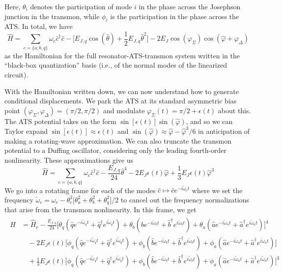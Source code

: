 Here, $\theta_i$ denotes the participation of mode $i$ in the phase across the Josephson junction in the transmon, while $\phi_i$ is the participation in the phase across the ATS. In total, we have
\begin{equation}
\hat{H} = \sum_{c = \{a, b, q\}}\omega_c \hat{c}^\dagger\hat{c} - \Big[E_{J,q}\cos(\hat{\theta}) + \frac{1}{2}E_{J,q} \hat{\theta}^2\Big] - 2E_J \cos(\varphi_\Sigma)\cos(\hat{\varphi} + \varphi_\Delta)
\end{equation}
as the Hamiltonian for the full resonator-ATS-transmon system written in the ``black-box quantization'' basis (i.e., of the normal modes of the linearized circuit). 

With the Hamiltonian written down, we can now understand how to generate conditional displacements. We park the ATS at its standard asymmetric bias point $(\varphi_\Sigma, \varphi_\Delta) = (\pi/2, \pi/2)$ and modulate $\varphi_\Sigma(t) = \pi/2 + \epsilon(t)$ about this. The ATS potential takes on the form $\sin[\epsilon(t)]\sin(\hat{\varphi})$, and so we can Taylor expand $\sin[\epsilon(t)] \approx \epsilon(t)$ and $\sin(\hat{\varphi}) \approx \hat{\varphi} - \hat{\varphi}^3/6$ in anticipation of making a rotating-wave approximation. We can also truncate the transmon potential to a Duffing oscillator, considering only the leading fourth-order nonlinearity. These approximations give us
\begin{equation}
\hat{H} = \sum_{c = \{a, b, q\}}\omega_c \hat{c}^\dagger\hat{c} - \frac{E_{J,q}}{24}\hat{\theta}^4 - 2E_J \epsilon(t)\hat{\varphi} + \frac{1}{3}E_J\epsilon(t)\hat{\varphi}^3
\end{equation}
We go into a rotating frame for each of the modes $\hat{c} \mapsto \hat{c} e^{-i\tilde{\omega}_c t}$ where we set the frequency $\widetilde{\omega}_c = \omega_c - \theta_{c}^{2} \big[\theta_{a}^{2} + \theta_{b}^{2} + \theta_{q}^{2}\big]/2$ to cancel out the frequency normalizations that arise from the transmon nonlinearity. In this frame, we get
\begin{align}
\begin{split}
\hat{H} &= \hat{H}_{r} - \frac{E_{J,q}}{24}\Big[\theta_q(\hat{q}e^{-i\tilde{\omega}_q t} + \hat{q}^\dagger e^{i\tilde{\omega}_q t}) + \theta_b(\hat{b}e^{-i\tilde{\omega}_b t} + \hat{b}^\dagger e^{i\tilde{\omega}_b t}) + \theta_a(\hat{a}e^{-i\tilde{\omega}_a t} + \hat{a}^\dagger e^{i\tilde{\omega}_a t})\Big]^4 \\&\quad- 2E_J\epsilon(t)\Big[\phi_q(\hat{q}e^{-i\tilde{\omega}_q t} + \hat{q}^\dagger e^{i\tilde{\omega}_q t}) + \phi_b(\hat{b}e^{-i\tilde{\omega}_b t} + \hat{b}^\dagger e^{i\tilde{\omega}_b t}) + \phi_a(\hat{a}e^{-i\tilde{\omega}_a t} + \hat{a}^\dagger e^{i\tilde{\omega}_a t})\Big]\\ &\quad + \frac{1}{3}E_J\epsilon(t)\Big[\phi_q(\hat{q}e^{-i\tilde{\omega}_q t} + \hat{q}^\dagger e^{i\tilde{\omega}_q t}) + \phi_b(\hat{b}e^{-i\tilde{\omega}_b t} + \hat{b}^\dagger e^{i\tilde{\omega}_b t}) + \phi_a(\hat{a}e^{-i\tilde{\omega}_a t} + \hat{a}^\dagger e^{i\tilde{\omega}_a t})\Big]^3
\end{split}
\end{align}
